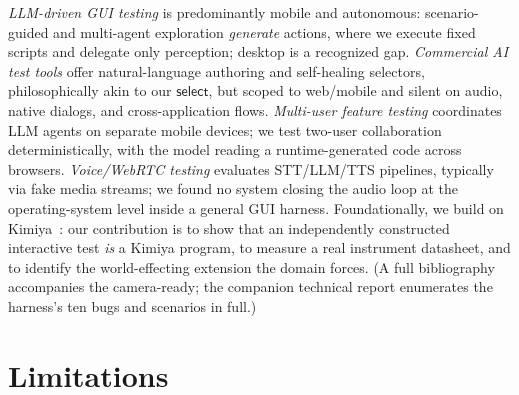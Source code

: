 \documentclass[acmsmall,screen,nonacm]{acmart}
\newcommand{\select}{\mathsf{select}}
\theoremstyle{acmdefinition}%
\theoremstyle{acmplain}%
\begin{document}
\emph{LLM-driven GUI testing} is predominantly mobile and autonomous:
scenario-guided and multi-agent exploration \emph{generate} actions,
where we execute fixed scripts and delegate only perception; desktop is a
recognized gap. \emph{Commercial AI test tools} offer natural-language
authoring and self-healing selectors, philosophically akin to our
$\select$, but scoped to web/mobile and silent on audio, native dialogs,
and cross-application flows. \emph{Multi-user feature testing} coordinates
LLM agents on separate mobile devices; we test two-user collaboration
deterministically, with the model reading a runtime-generated code across
browsers. \emph{Voice/WebRTC testing} evaluates STT/LLM/TTS pipelines,
typically via fake media streams; we found no system closing the audio
loop at the operating-system level inside a general GUI harness.
Foundationally, we build on Kimiya~\citep{kimiya}: our contribution is to
show that an independently constructed interactive test \emph{is} a Kimiya
program, to measure a real instrument datasheet, and to identify the
world-effecting extension the domain forces. (A full bibliography accompanies
the camera-ready; the companion technical report enumerates the harness's
ten bugs and scenarios in full.)

\section{Limitations}
\label{sec:limits}
\end{document}
